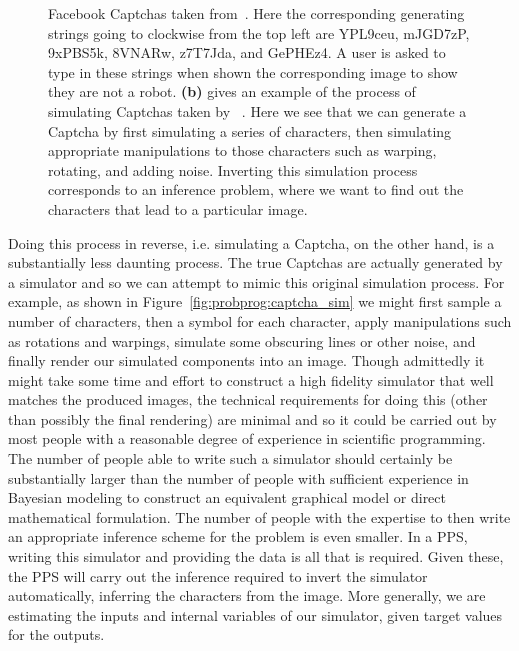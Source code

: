 \begin{figure}[t]
{		Facebook Captchas taken from~\cite{le2017using}.  Here the corresponding
		generating strings going
		to clockwise from the top left are YPL9ceu, mJGD7zP, 9xPBS5k, 8VNARw, z7T7Jda, and
		GePHEz4.  A user is asked to type in these strings when shown the corresponding
		image to show they are not a robot.
		\textbf{(b)} gives an example of the process of simulating Captchas taken by
		~\cite{le2017inference}.  Here we see that we can generate a Captcha by first
		simulating a series of characters, then simulating appropriate manipulations 
		to those characters such as warping, rotating, and adding noise.  Inverting this
		simulation process corresponds to an inference problem, where we want to find
		out the characters that lead to a particular image.
		\label{fig:probprog:captcha}}
\end{figure}

Doing this process in reverse, i.e. simulating a Captcha, on the other hand, is a substantially
less daunting process.  The true Captchas are actually generated by
a simulator and so we can attempt to mimic this original simulation process.
For example, as shown in Figure~\ref{fig:probprog:captcha_sim} we might first sample a 
number of characters, then a symbol for each character, apply manipulations such as rotations and warpings, simulate
some obscuring lines or other noise, and finally render our simulated components into an
image.  Though admittedly it might take some time and effort to construct a high fidelity
simulator that well matches the produced images, the technical requirements for doing this
(other than possibly the final rendering) are minimal and so it could be carried out by most
people with a reasonable degree of experience in scientific programming.  The number of
people able to write such a simulator should certainly be substantially larger than the
number of people with sufficient experience in Bayesian modeling to construct an equivalent
graphical model or direct mathematical formulation.  The number of people
with the expertise to then write an appropriate inference scheme for the problem is even
smaller.  In a PPS, writing this simulator and providing the data is all that is required.
Given these, the PPS will carry out the inference required to invert the simulator automatically,
inferring the characters from the image.  More generally, we are estimating the inputs and
internal variables of our simulator, given target values for the outputs.


